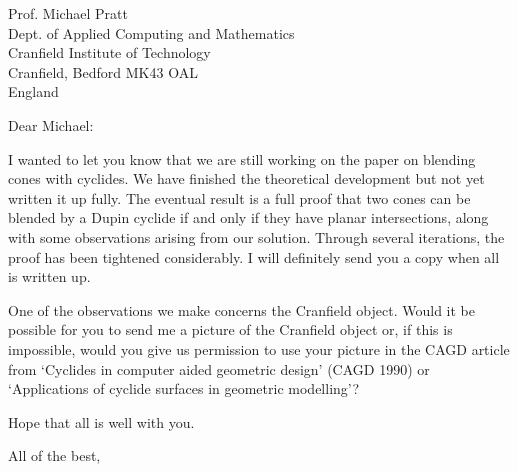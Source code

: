 \signature{John K. Johnstone\\jj@cs.jhu.edu}

\begin{letter}
{Prof. Michael Pratt\\
Dept. of Applied Computing and Mathematics\\
Cranfield Institute of Technology\\
Cranfield, Bedford  MK43 OAL\\
England
}

\opening{Dear Michael:}

I wanted to let you know that we are still working on the paper
on blending cones with cyclides.
We have finished the theoretical development but not yet written it up fully.
The eventual result is a full proof that 
two cones can be blended by a Dupin cyclide
if and only if they have planar intersections, 
along with some observations arising from our solution.
Through several iterations, the proof has been tightened considerably.
I will definitely send you a copy when all is written up.

One of the observations we make concerns the Cranfield object.
Would it be possible for you to send me a picture of the Cranfield object
or, if this is impossible, would you give us permission to use
your picture in the CAGD article
from `Cyclides in computer aided geometric design' (CAGD 1990)
or `Applications of cyclide surfaces in geometric modelling'?

Hope that all is well with you.

\closing{All of the best,}
\end{letter}

